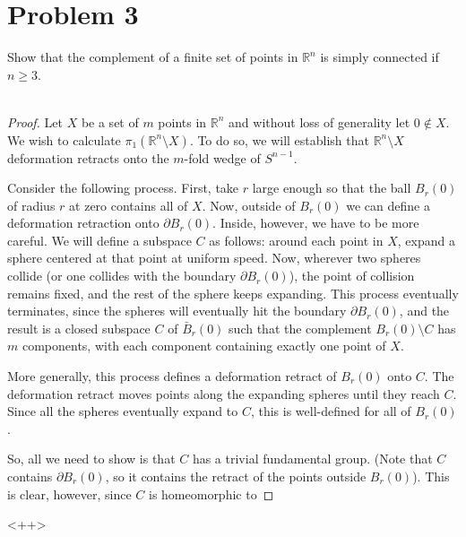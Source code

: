 \documentclass[fontsize=11pt]{scrartcl} %
\numberwithin{equation}{section} %
\numberwithin{figure}{section} %
\numberwithin{table}{section} %
\newcommand{\R}{\mathbb{R}}
\begin{document}
\section*{Problem 3}
Show that the complement of a finite set of points in $\R^n$ is simply connected
if $n\geq 3$.
\\
\\
\begin{proof}
    Let $X$ be a set of $m$ points in $\R^n$ and without loss of generality let
    $0\not\in X$. We wish to calculate $\pi_1(\R^n\setminus X)$. To do so, we
    will establish that $\R^n\setminus X$ deformation retracts onto the $m$-fold
    wedge of $S^{n-1}$.

    Consider the following process. First, take $r$ large enough so that the
    ball $B_r(0)$ of radius $r$ at zero contains all of $X$. Now, outside of
    $B_r(0)$ we can define a deformation retraction onto $\partial B_r(0)$.
    Inside, however, we have to be more careful. We will define a subspace $C$ as
    follows: around each point in $X$, expand a sphere centered at that point at
    uniform speed. Now, wherever two spheres collide (or one collides with the
    boundary $\partial B_r(0)$), the point of collision remains fixed, and the
    rest of the sphere keeps expanding. This process eventually terminates,
    since the spheres will eventually hit the boundary $\partial B_r(0)$, and
    the result is a closed subspace $C$ of $\bar{B}_r(0)$ such that the
    complement $B_r(0)\setminus C$ has $m$ components, with each component
    containing exactly one point of $X$.
    
    More generally, this process defines a deformation retract of $B_r(0)$ onto
    $C$. The deformation retract moves points along the expanding spheres until
    they reach $C$. Since all the spheres eventually expand to $C$, this is
    well-defined for all of $B_r(0)$.

    So, all we need to show is that $C$ has a trivial fundamental group. (Note
        that $C$ contains $\partial B_r(0)$, so it contains the retract of the
    points outside $B_r(0)$).
    This is clear, however, since $C$ is homeomorphic to 
\end{proof}<++>
\end{document}
